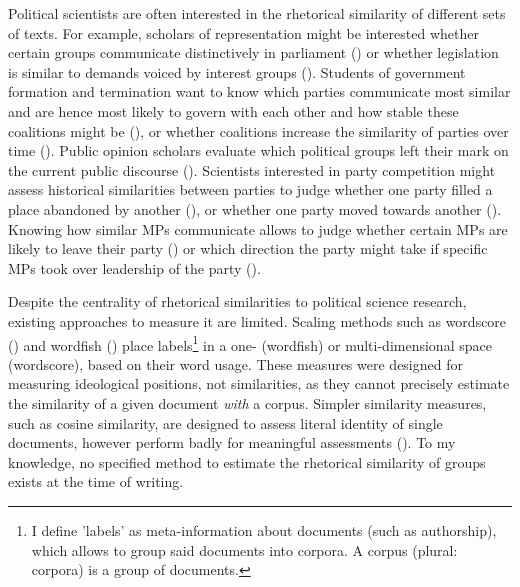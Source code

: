 \documentclass{article}
\begin{document}
Political scientists are often interested in the rhetorical similarity of different sets of texts. For example, scholars of representation might be interested whether certain groups communicate distinctively in parliament (\cite{Pitkin1967}) or whether legislation is similar to demands voiced by interest groups (\cite{Kluver2019}). Students of government formation and termination want to know which parties communicate most similar and are hence most likely to govern with each other and how stable these coalitions might be (\cite{Gamson1961, Grofman1994}), or whether coalitions increase the similarity of parties over time (\cite{Spoon2019}). Public opinion scholars evaluate which political groups left their mark on the current public discourse (\cite{Wagner2017, Slothuus2010k}). Scientists interested in party competition might assess historical similarities between parties to judge whether one party filled a place abandoned by another (\cite{Kitschelt1986}), or whether one party moved towards another (\cite{Downs1957, Meguid2005b}). Knowing how similar MPs communicate allows to judge whether certain MPs are likely to leave their party (\cite{Hirschman1970}) or which direction the party might take if specific MPs took over leadership of the party (\cite{Fernandez-Vazquez2016}).\par

Despite the centrality of rhetorical similarities to political science research, existing approaches to measure it are limited. Scaling methods such as wordscore (\cite{Laver2003}) and wordfish (\cite{Slapin2008}) place labels\footnote{I define 'labels' as meta-information about documents (such as authorship), which allows to group said documents into corpora. A corpus (plural: corpora) is a group of documents.} in a one- (wordfish) or multi-dimensional space (wordscore), based on their word usage. These measures were designed for measuring ideological positions, not similarities, as they cannot precisely estimate the similarity of a given document \textit{with} a corpus. %
Simpler similarity measures, such as cosine similarity, are designed to assess literal identity of single documents, however perform badly for meaningful assessments (\cite{Prasetya2018}). To my knowledge, no specified method to estimate the rhetorical similarity of groups exists at the time of writing.\par
\end{document}

